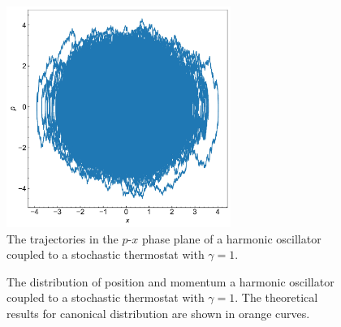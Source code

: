 \documentclass{article}
\begin{document}
\begin{figure}
    \centering
    \includegraphics[width=0.65\textwidth]{stochastic.jpg}
    \caption{The trajectories in the $p$-$x$ phase plane of a harmonic oscillator coupled to a stochastic thermostat with $\gamma = 1$.}
\end{figure}
\begin{figure}
    \centering
    \caption{The distribution of position and momentum a harmonic oscillator coupled to a stochastic thermostat with $\gamma = 1$. The theoretical results for canonical distribution are shown in orange curves.}
\end{figure}
\end{document}
